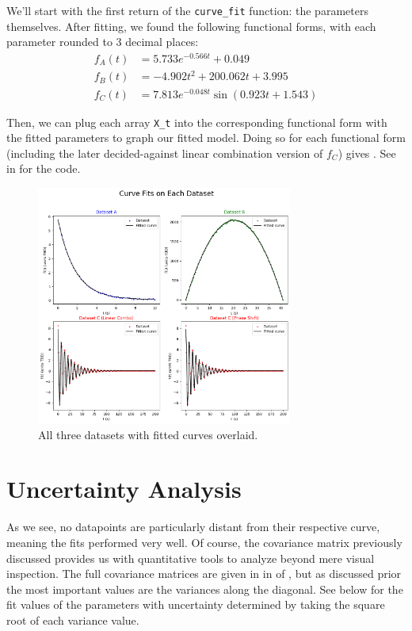 \documentclass{article}
\begin{document}
We'll start with the first return of the \verb|curve_fit| function: the parameters themselves. After
fitting, we found the following functional forms, with each parameter rounded to 3 decimal places:
\begin{align*}
    f_A(t) &= 5.733e^{-0.566t} + 0.049 \\
    f_B(t) &= -4.902t^2 + 200.062t + 3.995 \\
    f_C(t) &= 7.813e^{-0.048t} \sin\left(0.923t + 1.543\right)
\end{align*}

Then, we can plug each array \verb|X_t| into the corresponding functional form with the fitted parameters 
to graph our fitted model. Doing so for each functional form (including the later decided-against linear 
combination version of $f_C$) gives . See  in  for the code.

\begin{figure}[ht]
    \centering

    \includegraphics[width=0.75\textwidth]{../figures/fit.png}

    \caption{All three datasets with fitted curves overlaid.}

    \label{fig:fit}
\end{figure}

\section{Uncertainty Analysis}

As we see, no datapoints are particularly distant from their respective curve, meaning the fits performed 
very well. Of course, the covariance matrix previously discussed provides us with quantitative tools to
analyze beyond mere visual inspection. The full covariance matrices are given in 
in  of , but as discussed prior the most important values are the variances 
along the diagonal. See  below for the fit values of the parameters with uncertainty 
determined by taking the square root of each variance value.
\end{document}
